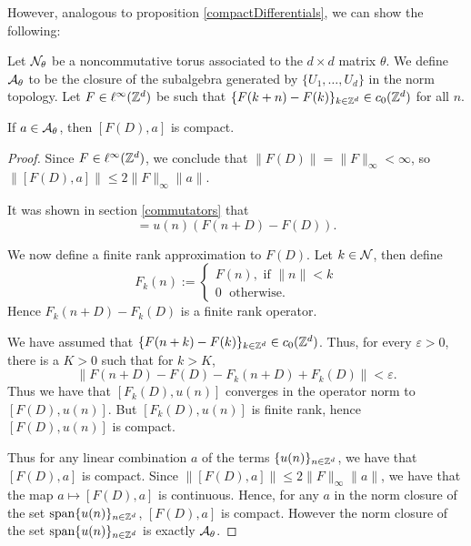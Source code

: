 However, analogous to proposition \ref{compactDifferentials}, we can show the following:
\begin{proposition}
\label{compactNCCommutators}
    Let $\mathcal{N}_\theta$ be a noncommutative torus associated
    to the $d\times d$ matrix $\theta$. We define $\mathcal{A}_\theta$
    to be the closure of the subalgebra generated by $\{U_1,\ldots,U_d\}$
    in the norm topology.
    Let $F \in \ell^\infty(\mathbb{Z}^d)$ be such
    that $\{F(k+n)-F(k)\}_{k \in \mathbb{Z}^d} \in c_0(\mathbb{Z}^d)$
    for all $n$. 
    
    If $a \in \mathcal{A}_\theta$, then $[F(D),a]$ is compact.
\end{proposition}
\begin{proof}
    Since $F \in \ell^\infty(\mathbb{Z}^d)$, we conclude that $\|F(D)\| = \|F\|_\infty < \infty$,
    so $\|[F(D),a]\| \leq 2\|F\|_\infty \|a\|$. 
    
    It was shown in section \ref{commutators} that 
    \begin{equation}
        [F(D),u(n)] = u(n)(F(n+D)-F(D)).
    \end{equation} 
    
    We now define a finite rank approximation to $F(D)$. Let $k \in \mathcal{N}$, then define
    \begin{equation}
        F_k(n) := \begin{cases}
            F(n),\text{ if }\|n\| < k\\
            0\;\text{ otherwise.}
        \end{cases} 
    \end{equation}
    Hence $F_k(n+D)-F_k(D)$ is a finite rank operator. 
    
    We have assumed that $\{F(n+k)-F(k)\}_{k \in \mathbb{Z}^d} \in c_0(\mathbb{Z}^d)$. Thus,
    for every $\varepsilon > 0$, there is a $K > 0$ such that for $k > K$,
    \begin{equation}
        \|F(n+D)-F(D) - F_k(n+D)+F_k(D)\| < \varepsilon.
    \end{equation}
    Thus we have that $[F_k(D),u(n)]$ converges in the operator
    norm to $[F(D),u(n)]$. But $[F_k(D),u(n)]$ is finite rank,
    hence $[F(D),u(n)]$ is compact.
    
    Thus for any linear combination $a$ of the terms $\{u(n)\}_{n \in \mathbb{Z}^d}$,
    we have that $[F(D),a]$ is compact. Since $\|[F(D),a]\| \leq 2\|F\|_\infty\|a\|$,
    we have that the map $a\mapsto [F(D),a]$ is continuous. Hence,
    for any $a$  in the norm closure of the set $\operatorname{span}\{u(n)\}_{n \in \mathbb{Z}^d}$, 
    $[F(D),a]$ is compact. However the norm closure of the set $\operatorname{span}\{u(n)\}_{n \in \mathbb{Z}^d}$
    is exactly $\mathcal{A}_\theta$.
\end{proof} 
